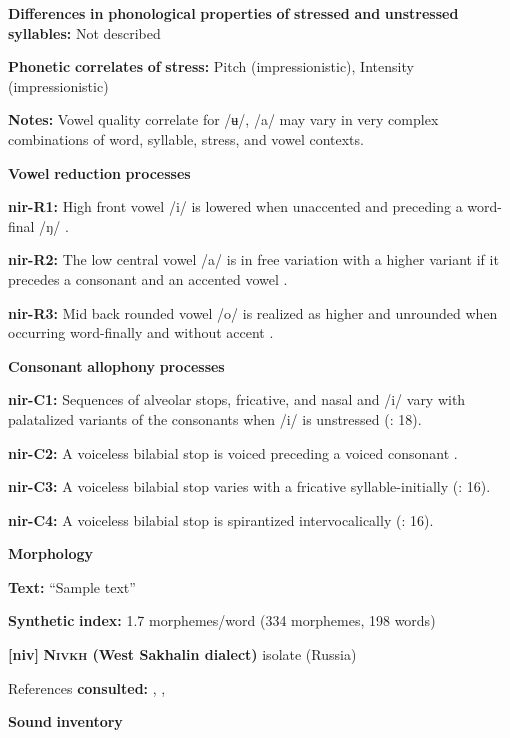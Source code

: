 \begin{styleBody}
\textbf{Differences} \textbf{in} \textbf{phonological} \textbf{properties} \textbf{of} \textbf{stressed} \textbf{and} \textbf{unstressed} \textbf{syllables:} Not described

\textbf{Phonetic} \textbf{correlates} \textbf{of} \textbf{stress:} Pitch (impressionistic), Intensity (impressionistic)

\textbf{Notes:} Vowel quality correlate for /ʉ/, /a/ may vary in very complex combinations of word, syllable, stress, and vowel contexts.

\textbf{Vowel} \textbf{reduction} \textbf{processes}

\textbf{nir-R1:} High front vowel /i/ is lowered when unaccented and preceding a word-final /ŋ/ \citep[10]{Anceaux1965}.

\textbf{nir-R2:} The low central vowel /a/ is in free variation with a higher variant if it precedes a consonant and an accented vowel \citep[13]{Anceaux1965}.

\textbf{nir-R3:} Mid back rounded vowel /o/ is realized as higher and unrounded when occurring word-finally and without accent \citep[14]{Anceaux1965}.

\textbf{Consonant} \textbf{allophony} \textbf{processes}

\textbf{nir-C1:} Sequences of alveolar stops, fricative, and nasal and /i/ vary with palatalized variants of the consonants when /i/ is unstressed (\citealt{MayMay1981}: 18).

\textbf{nir-C2:} A voiceless bilabial stop is voiced preceding a voiced consonant \citep[30]{May1997}.

\textbf{nir-C3:} A voiceless bilabial stop varies with a fricative syllable-initially (\citealt{MayMay1981}: 16).

\textbf{nir-C4:} A voiceless bilabial stop is spirantized intervocalically (\citealt{MayMay1981}: 16).

\textbf{Morphology}

\textbf{Text:} “Sample text” \citep[172-177]{May1997}

\textbf{Synthetic} \textbf{index:} 1.7 morphemes/word (334 morphemes, 198 words)

\textbf{[niv]}   \textbf{\textsc{Nivkh} \textbf{(West} \textbf{Sakhalin} \textbf{dialect)}}  isolate (Russia)

References \textbf{consulted:} \citet{Gruzdeva1998}, \citet{Kreinovich1979}, \citet{Shiraishi2006}

\textbf{Sound} \textbf{inventory}


\end{styleBody}

